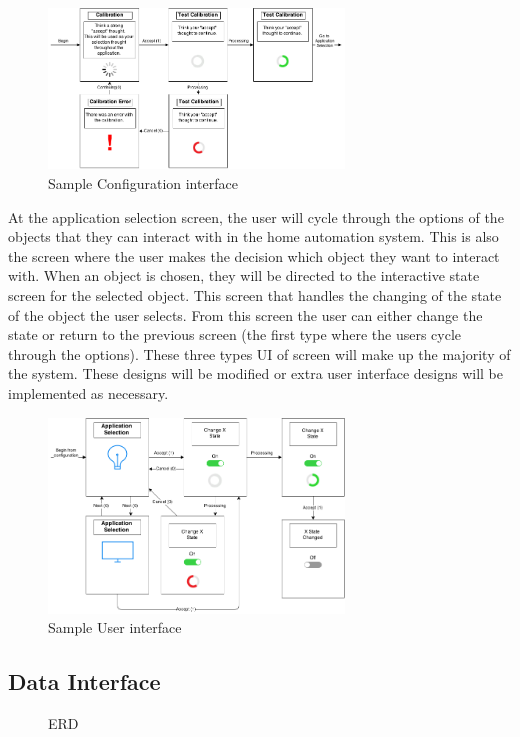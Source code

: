 \documentclass{article}
\begin{document}
\begin{figure}[h!]
	
  \centering
    \includegraphics[width=0.7\textwidth]{ConfigurationUI}
   \caption{Sample Configuration interface}
   \label{fig:ui}
\end{figure}

At the application selection screen, the user will cycle through the options of the objects that they can interact with in the home automation system. This is also the screen where the user makes the decision which object they want to interact with. When an object is chosen, they will be directed to the interactive state screen for the selected object. This screen that handles the changing of the state of the object the user selects. From this screen the user can either change the state or return to the previous screen (the first type where the users cycle through the options). These three types UI of screen will make up the majority of the system. These designs will be modified or extra user interface designs will be implemented as necessary. 

\begin{figure}[h!]
	
  \centering
    \includegraphics[width=0.7\textwidth]{ApplicationUI}
   \caption{Sample User interface}
   \label{fig:ui}
\end{figure}

\subsection{Data Interface}
\begin{figure}[h!]

  \centering
  \resizebox{\textwidth}{!}{
        
    }
   \caption{ERD}
   	\label{fig:erd}
\end{figure}
\end{document}

